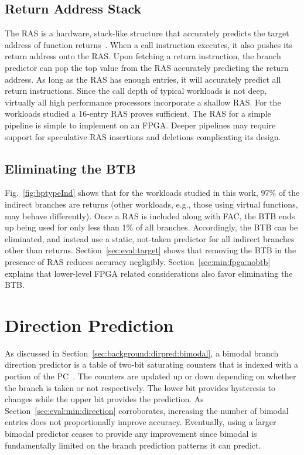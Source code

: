 \subsection{Return Address Stack}
\label{sec:min:target:ras}
The RAS is a hardware, stack-like structure that accurately predicts the target address of function returns~\cite{ras}. When a call instruction executes, it also pushes its return address  onto the RAS. Upon fetching a return instruction, the branch predictor can pop the top value from the RAS  accurately predicting the return address. As long as the RAS has enough entries, it will accurately predict all return instructions. Since the call depth of typical workloads is not deep, virtually all high performance processors incorporate a shallow RAS. For the workloads studied a 16-entry RAS proves sufficient. The RAS for a simple pipeline is simple to implement on an FPGA. Deeper pipelines may require support for speculative RAS insertions and deletions complicating its design. 


\subsection{Eliminating the BTB}
\label{sec:min:target:nobtb}
Fig.~\ref{fig:bptypeInd} shows that for the workloads studied in this work, 97\% of the indirect branches are returns (other workloads, e.g., those using virtual functions, may behave differently). Once a RAS is included along with FAC, the BTB ends up being used for only less than 1\% of all branches. Accordingly, the BTB can be eliminated, and instead use a static, not-taken predictor for all indirect branches other than returns. Section~\ref{sec:eval:target} shows that removing the BTB in the presence of RAS reduces accuracy negligibly. Section~\ref{sec:min:fpga:nobtb} explains that lower-level FPGA related considerations also favor eliminating the BTB.

\section{Direction Prediction}
\label{sec:min:direction}
As discussed in Section~\ref{sec:background:dirpred:bimodal}, a bimodal branch direction predictor is a table of two-bit saturating counters that is indexed with a portion of the PC~\cite{bimodal}. The counters are updated up or down depending on whether the branch is taken or not respectively. The lower bit provides hysteresis to changes while the upper bit provides the prediction. As Section~\ref{sec:eval:min:direction} corroborates, increasing the number of bimodal entries does not proportionally improve accuracy. Eventually, using a larger bimodal predictor ceases to provide any improvement since bimodal is fundamentally limited on the branch prediction patterns it can predict.

